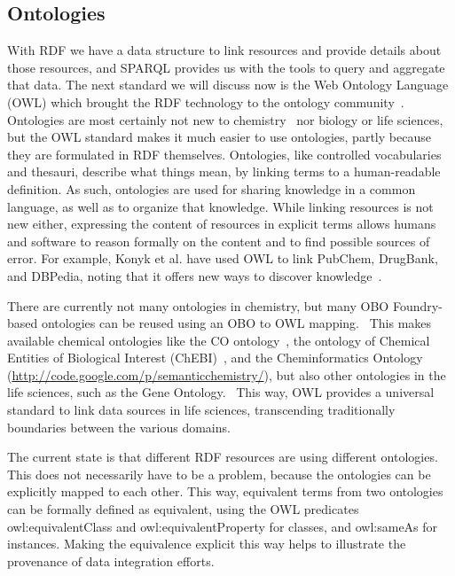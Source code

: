 \documentclass[10pt]{bmc_article}
\newenvironment{bmcformat}{\begin{raggedright}\baselineskip20pt\sloppy\setboolean{publ}{false}}{\end{raggedright}\baselineskip20pt\sloppy}
\begin{document}
\begin{bmcformat}
\section{Ontologies}

With RDF we have a data structure to link resources and provide details about
those resources, and SPARQL provides us with the tools to query and aggregate that data.
The next standard we will discuss now is the Web Ontology
Language (OWL) which brought the RDF technology to the ontology community~\cite{GUN2004}.
Ontologies are most certainly not new to chemistry~\cite{Gordon1988} nor biology or life sciences,
but the OWL standard makes it much easier to use ontologies, partly because
they are formulated in RDF themselves. Ontologies, like
controlled vocabularies and thesauri, describe what things mean, by linking
terms to a human-readable definition. As such, ontologies are used for sharing
knowledge in a common language, as well as to organize that knowledge.
While linking resources is not new either, expressing the content of resources
in explicit terms allows humans and software to reason formally on the content and to find possible sources of error.
For example, Konyk et al. have used OWL to link PubChem,
DrugBank, and DBPedia, noting that it offers new ways to
discover knowledge~\cite{Konyk2008}.


There are currently not many ontologies in chemistry, but many OBO Foundry-based
ontologies can be reused using an OBO to OWL mapping.~\cite{Moreira2007} This makes
available chemical ontologies like the CO ontology~\cite{Feldman2005},
the ontology of Chemical Entities of Biological Interest (ChEBI)~\cite{Degtyarenko2008,Hull2008},
and the Cheminformatics Ontology (\url{http://code.google.com/p/semanticchemistry/}),
but also other ontologies in the life sciences, such as the Gene Ontology.~\cite{Aranguren2007}
This way, OWL provides a universal standard to link data sources in life
sciences, transcending traditionally boundaries between the various domains.

The current state is that different RDF resources are using different ontologies.
This does not necessarily have to be a problem, because the ontologies can be
explicitly mapped to each other. This way, equivalent terms from two ontologies
can be formally defined as equivalent, using the OWL predicates owl:equivalentClass
and owl:equivalentProperty for classes, and owl:sameAs for instances.
Making the equivalence explicit this way helps to illustrate the provenance of data integration efforts. 


\end{bmcformat}
\end{document}

